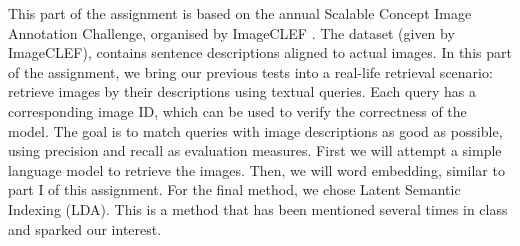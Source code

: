 This part of the assignment is based on the annual Scalable Concept Image Annotation Challenge, organised by ImageCLEF \cite{imageclef}. The dataset (given by ImageCLEF), contains sentence descriptions aligned to actual images. In this part of the assignment, we bring our previous tests into a real-life retrieval scenario: retrieve images by their descriptions using textual queries. Each query has a corresponding image ID, which can be used to verify the correctness of the model. The goal is to match queries with image descriptions as good as possible, using precision and recall as evaluation measures.
\newline
\newline
First we will attempt a simple language model to retrieve the images. Then, we will word embedding, similar to part I of this assignment. For the final method, we chose Latent Semantic Indexing (LDA). This is a method that has been mentioned several times in class and sparked our interest.
